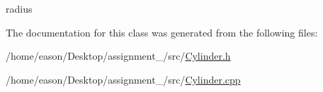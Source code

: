 radius 



The documentation for this class was generated from the following files\+:\begin{DoxyCompactItemize}
\item 
/home/eason/\+Desktop/assignment\+\_/src/\hyperlink{Cylinder_8h}{Cylinder.\+h}\item 
/home/eason/\+Desktop/assignment\+\_/src/\hyperlink{Cylinder_8cpp}{Cylinder.\+cpp}\end{DoxyCompactItemize}
